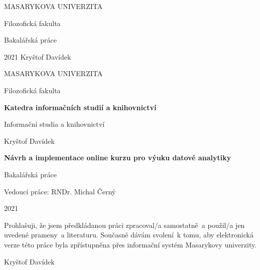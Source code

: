 \documentclass[a4paper,12pt,openany,twoside]{book} %
\begin{document}
	\clearpage


		\begin{center}
			{\Large\uppercase{Masarykova univerzita}}

			\vspace{2em}

			{\Large Filozofická fakulta}

			\vspace{20em}

			{\LARGE Bakalářská práce}

			\vfill
			    {\LARGE 2021}
			    \hfill
            	{\LARGE Kryštof Davídek}
		\end{center}

		\begin{center}
			{\Large\uppercase{Masarykova univerzita}}

			\vspace{2em}

			{\Large Filozofická fakulta}

			\vspace{5em}

			{\Large\bf Katedra informačních studií a knihovnictví}

			\vspace{2em}

			{\Large Informační studia a knihovnictví}

			\vspace{11em}

			{\large Kryštof Davídek }
			
			\vspace{3em}
			
			{\LARGE\bf Návrh a implementace online kurzu pro výuku datové analytiky}

			\vspace{1.5em}

			{\Large Bakalářská práce}

			\vfill
			\vspace{3em}
			{\large Vedoucí práce: RNDr. Michal Černý}
			\vspace{1em}
			
			{\large 2021}
		\end{center}
		
\newpage

\par
\par\vspace*{\fill}
	\pagestyle{plain}
\begin{flushright}
	Prohlašuji, že jsem předkládanou práci zpracoval/a samostatně~a použil/a jen uvedené prameny~a literaturu. Současně dávám svolení~k tomu, aby elektronická verze této práce byla zpřístupněna přes informační systém Masarykovy univerzity.

	\vspace{3em}

	    \makebox[2.5in][r]{\dotfill}
	    
	    Kryštof Davídek

	    \par

\end{flushright}
\clearpage
\end{document}
